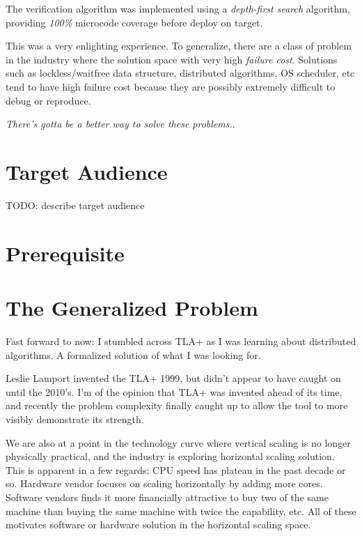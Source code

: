 \documentclass{report}
\begin{document}
The verification algorithm was implemented using a \textit{depth-first search}
algorithm, providing \textit{100\%} microcode coverage before deploy on
target.\newline

This was a very enlighting experience. To generalize, there are a class of
problem in the industry where the solution space with very high \textit{failure
cost}.  Solutions such as lockless/waitfree data structure, distributed
algorithms, OS scheduler, etc tend to have high failure cost because they are
possibly extremely difficult to debug or reproduce. \newline 

\textit{There's gotta be a better way to solve these problems.}. 

\section{Target Audience}

TODO: describe target audience 

\section{Prerequisite}

\section{The Generalized Problem}

Fast forward to now: I stumbled across TLA+ as I was learning about distributed
algorithms.  A formalized solution of what I was looking for.\newline

Leslie Lamport invented the TLA+ 1999, but didn't appear to have caught on until
the 2010's. I'm of the opinion that TLA+ was invented ahead of its time, and
recently the problem complexity finally caught up to allow the tool to more
visibly demonstrate its strength.\newline

We are also at a point in the technology curve where vertical scaling is no
longer physically practical, and the industry is exploring horizontal scaling
solution. This is apparent in a few regards: CPU speed has plateau in the past
decade or so. Hardware vendor focuses on scaling horizontally by adding more
cores. Software vendors finds it more financially attractive to buy two of the
same machine than buying the same machine with twice the capability, etc. All of
these motivates software or hardware solution in the horizontal scaling space.\newline
\end{document}

